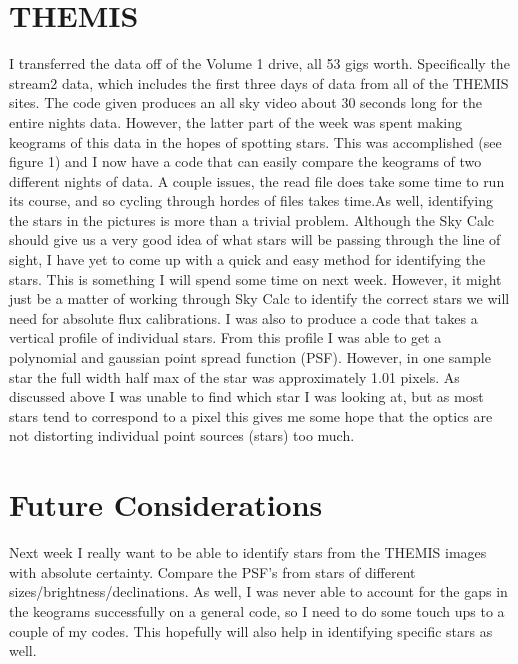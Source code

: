 \documentclass[11pt]{article}
\begin{document}
\section{THEMIS}

 I transferred the data off of the Volume 1 drive, all 53 gigs worth. Specifically the stream2 data, which includes the first three days of data from all of the THEMIS sites. The code given produces an all sky video about 30 seconds long for the entire nights data. However, the latter part of the week was spent making keograms of this data in the hopes of spotting stars. This was accomplished (see figure 1)  and I now have a code that can easily compare the keograms of two different nights of data. A couple issues, the read file does take some time to run its course, and so cycling through hordes of files takes time.As well, identifying the stars in the pictures is more than a trivial problem. Although the Sky Calc should give us a very good idea of what stars will be passing through the line of sight, I have yet to come up with a quick and easy method for identifying the stars.  This is something I will spend some time on next week. However, it might just be a matter of working through Sky Calc to identify the correct stars we will need for absolute flux calibrations.  I was also to produce a code that takes a vertical profile of individual stars. From this profile I was able to get a polynomial and gaussian point spread function (PSF). However, in one sample star the full width half max of the star was approximately 1.01 pixels. As discussed above I was unable to find which star I was looking at, but as most stars tend to correspond to a pixel this gives me some hope that the optics are not distorting individual point sources (stars) too much. 




\section{Future Considerations}

Next week I really want to be able to identify stars from the THEMIS images with absolute certainty. Compare the PSF's from stars of different sizes/brightness/declinations. As well, I was never able to account for the gaps in the keograms successfully on a general code, so I need to do some touch ups to a couple of my codes. This hopefully will also help in identifying specific stars as well.
\end{document}
